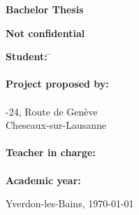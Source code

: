 
\begin{titlepage}
  \thispagestyle{firstpage}
  \begin{center}
    \vspace*{3cm}

    \Huge
    \textbf{Bachelor Thesis}

    \vspace{1cm}
    \Huge
    \TBtitle

    \vspace{0.2cm}
    \Large
    \textbf{Not confidential}
  \end{center}

  \vspace{7cm}
  \begin{tabbing}
    \linespread{3}\textbf{Student:} \hspace{12em} \= \TBauthor\\\\

    \textbf{Project proposed by:} \> \TBindustryContact\\
    \> \TBindustryName\\
    -24, Route de Genève\\
     Cheseaux-sur-Lausanne\\\\

    \textbf{Teacher in charge:} \> \TBsupervisor\\\\

    \textbf{Academic year:} \> \TBacademicYears
  \end{tabbing}

  \vspace{2cm}
  \begin{flushright}
    Yverdon-les-Bains, \today
  \end{flushright}
\end{titlepage}
